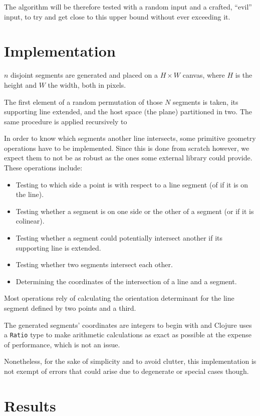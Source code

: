 \documentclass[12pt,a4paper]{article}
\begin{document}
The algorithm will be therefore tested with a random input and a
crafted, ``evil'' input, to try and get close to this upper bound
without ever exceeding it.

\section{Implementation}

$n$ disjoint segments are generated and placed on a $H\times W$
canvas, where $H$ is the height and $W$ the width, both in pixels.

The first element of a random permutation of those $N$ segments is
taken, its supporting line extended, and the host space (the plane)
partitioned in two. The same procedure is applied recursively to

In order to know which segments another line intersects, some
primitive geometry operations have to be implemented. Since this is
done from scratch however, we expect them to not be as robust as the
ones some external library could provide. These operations include:

\begin{itemize}
\item Testing to which side a point is with respect to a line segment
  (of if it is on the line).
\item Testing whether a segment is on one side or the other of a
  segment (or if it is colinear).
\item Testing whether a segment could potentially intersect another if
  its supporting line is extended.
\item Testing whether two segments intersect each other.
\item Determining the coordinates of the intersection of a line and a
  segment.
\end{itemize}

Most operations rely of calculating the orientation determinant for
the line segment defined by two points and a third.

The generated segments' coordinates are integers to begin with and
Clojure uses a \texttt{Ratio} type to make arithmetic calculations as
exact as possible at the expense of performance, which is not an
issue.

Nonetheless, for the sake of simplicity and to avoid clutter, this
implementation is not exempt of errors that could arise due to
degenerate or special cases though.

\section{Results}
\end{document}
